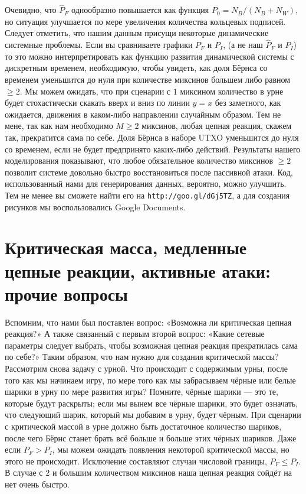 \documentclass{mrl}
\begin{document}
Очевидно, что $\widehat{P}_F$ однообразно повышается как функция $P_0 = N_B/(N_B + N_W)$, но ситуация улучшается по мере увеличения количества кольцевых подписей. Следует отметить, что нашим данным присущи некоторые динамические системные проблемы. Если вы сравниваете графики $P_F$ и $P_I$, (а не наш $\widehat{P}_F$ и $P_I$) то это можно интерпретировать как функцию развития динамической системы с дискретным временем, необходимую, чтобы увидеть, как доля Бёрнса со временем уменьшится до нуля при количестве миксинов большем либо равном $\geq 2$. Мы можем ожидать, что при сценарии с $1$ миксином количество в урне будет стохастически скакать вверх и вниз по линии $y=x$ без заметного, как ожидается, движения в каком-либо направлении случайным образом. Тем не мене, так как нам необходимо $M \geq 2$ миксинов, любая цепная реакция, скажем так, прекратится сама по себе. Доля Бёрнса в наборе UTXO уменьшится до нуля со временем, если не будет предпринято каких-либо действий. Результаты нашего моделирования показывают, что любое обязательное количество миксинов $\geq 2$ позволит системе довольно быстро восстановиться после пассивной атаки. Код, использованный нами для генерирования данных, вероятно, можно улучшить. Тем не менее вы сможете найти его на \texttt{http://goo.gl/dGj5TZ}, а для создания рисунков мы воспользовались Google Documents.

\section{Критическая масса, медленные цепные реакции, активные атаки: прочие вопросы}

Вспомним, что нами был поставлен вопрос: «Возможна ли критическая цепная реакция?» А также связанный с первым второй вопрос: «Какие сетевые параметры следует выбрать, чтобы возможная цепная реакция прекратилась сама по себе?» Таким образом, что нам нужно для создания критической массы? Рассмотрим снова задачу с урной. Что происходит с содержимым урны, после того как мы начинаем игру, по мере того как мы забрасываем чёрные или белые шарики в урну по мере развития игры? Помните, чёрные шарики — это те, которые будут раскрыты; если мы вынем все чёрные шарики, это будет означать, что следующий шарик, который мы добавим в урну, будет чёрным. При сценарии с критической массой в урне должно быть достаточное количество шариков, после чего Бёрнс станет брать всё больше и больше этих чёрных шариков. Даже если $P_F > P_I$, мы можем ожидать появления некоторой критической массы, но этого не происходит. Исключение составляют случаи числовой границы, $P_F \leq P_I$. В случае с $2$ и большим количеством миксинов наша цепная реакция сойдёт на нет очень быстро.
\end{document}
